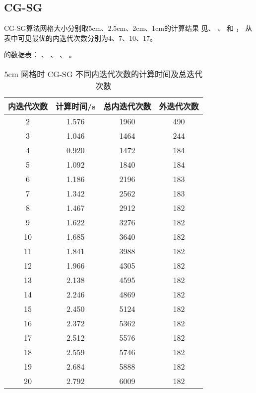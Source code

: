 \subsection{CG-SG}
\label{sec:equsolve.iter.cg-sg}

CG-SG算法网格大小分别取5cm、2.5cm、2cm、1cm的计算结果
见、%
、%
和%
，
从表中可见最优的内迭代次数分别为4、7、10、17。


\begin{datasheet}
的数据表：
、
、
、
。

\begin{table}
\centering
\caption{5cm 网格时 CG-SG 不同内迭代次数的计算时间及总迭代次数}
\label{tab:equsolve.iter.cg-sg.5cm}
\begin{tabular}{cccc}
\toprule
内迭代次数 & 计算时间/s & 总内迭代次数 & 外迭代次数\\
\midrule
2 & 1.576 & 1960 & 490\\
3 & 1.046 & 1464 & 244\\
4 & 0.920 & 1472 & 184\\
5 & 1.092 & 1840 & 184\\
6 & 1.186 & 2196 & 183\\
7 & 1.342 & 2562 & 183\\
8 & 1.467 & 2912 & 182\\
9 & 1.622 & 3276 & 182\\
10 & 1.685 & 3640 & 182\\
11 & 1.841 & 3988 & 182\\
12 & 1.966 & 4305 & 182\\
13 & 2.138 & 4595 & 182\\
14 & 2.246 & 4869 & 182\\
15 & 2.450 & 5124 & 182\\
16 & 2.372 & 5362 & 182\\
17 & 2.512 & 5576 & 182\\
18 & 2.559 & 5746 & 182\\
19 & 2.684 & 5888 & 182\\
20 & 2.792 & 6009 & 182\\
\bottomrule
\end{tabular}
\end{table}


\end{datasheet}
